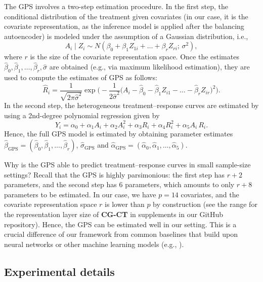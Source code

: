 \documentclass[sigconf]{acmart}
\newcommand{\framework}{\textbf{\mbox{CG-CT}}\xspace}
\begin{document}
The GPS involves a two-step estimation procedure. In the first step, the conditional distribution of the treatment given covariates (in our case, it is the covariate representation, as the inference model is applied after the balancing autoencoder) is modeled under the assumption of a Gaussian distribution, i.e., 
\begin{equation}
    A_i \mid Z_i \sim N(\beta_0 + \beta_1 Z_{1i} + \ldots + \beta_r Z_{ri}; \, \sigma^2),
\end{equation}
where $r$ is the size of the covariate representation space. Once the estimates $\hat{\beta}_0, \hat{\beta}_1, \ldots, \hat{\beta}_r, \hat{\sigma}$ are obtained (e.g., via maximum likelihood estimation), they are used to compute the estimates of GPS as follows:
\begin{equation}
    \hat{R}_i = \frac{1}{\sqrt{2\pi\hat{\sigma}^2}} \exp \bigg( - \frac{1}{2\hat{\sigma}^2} \big( A_i - \hat{\beta}_0 - \hat{\beta}_1 Z_{i1} - \ldots - \hat{\beta}_r Z_{ir} \big)^2 \bigg).
\end{equation}
In the second step, the heterogeneous treatment--response curves are estimated by using a 2nd-degree polynomial regression given by
\begin{equation}
    Y_i = \alpha_0 + \alpha_1 A_i + \alpha_2 A_i^2 + \alpha_3 R_i + \alpha_4 R_i^2 + \alpha_5 A_i \, R_i.
\end{equation}
Hence, the full GPS model is estimated by obtaining parameter estimates $\hat{\beta}_{\mathrm{GPS}} = (\hat{\beta}_0, \hat{\beta}_1, \ldots, \hat{\beta}_r) $, $\hat{\sigma}_{\mathrm{GPS}}$ and $\hat{\alpha}_{\mathrm{GPS}} = (\hat{\alpha}_0, \hat{\alpha}_1, \ldots, \hat{\alpha}_5) $.

Why is the GPS able to predict treatment--response curves in small sample-size settings? Recall that the GPS is highly parsimonious: the first step has $r+2$ parameters, and the second step has 6 parameters, which amounts to only $r+8$ parameters to be estimated. In our case, we have $p=14$ covariates, and the covariate representation space $r$ is lower than $p$ by construction (see the range for the representation layer size of \framework in supplements in our GitHub repository). Hence, the GPS can be estimated well in our setting. This is a crucial difference of our framework from common baselines that build upon neural networks or other machine learning models (e.g., \cite{Bica2020,Schwab2020}). 

\subsection{Experimental details} 
\end{document}

